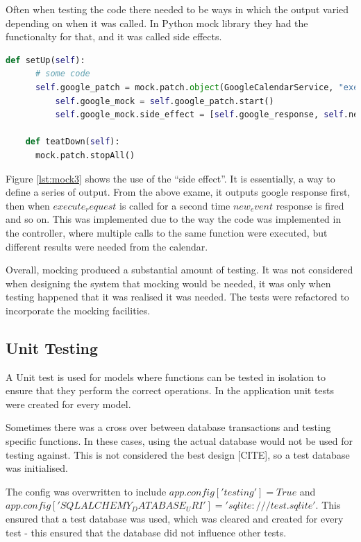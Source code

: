 Often when testing the code there needed to be ways in which the output varied depending on when it was called. In Python mock library they had the functionalty for that, and it was called side effects.

\begin{lstlisting}[language=python, label={lst:mock3}, breaklines, columns=fullflexible, keywordstyle=\color{blue}]
    def setUp(self):
      # some code
      self.google_patch = mock.patch.object(GoogleCalendarService, "execute_request")
          self.google_mock = self.google_patch.start()
          self.google_mock.side_effect = [self.google_response, self.new_event, self.google_response, self.updated_response]

    def teatDown(self):
      mock.patch.stopAll()
\end{lstlisting}

Figure \ref{lst:mock3} shows the use of the ``side effect''. It is essentially, a way to define a series of output. From the above exame, it outputs google response first, then when $execute_request$ is called for a second time $new_event$ response is fired and so on. This was implemented due to the way the code was implemented in the controller, where multiple calls to the same function were executed, but different results were needed from the calendar.

Overall, mocking produced a substantial amount of testing. It was not considered when designing the system that mocking would be needed, it was only when testing happened that it was realised it was needed. The tests were refactored to incorporate the mocking facilities.

\subsection{Unit Testing}
A Unit test is used for models where functions can be tested in isolation to ensure that they perform the correct operations. In the application unit tests were created for every model.

Sometimes there was a cross over between database transactions and testing specific functions. In these cases, using the actual database would not be used for testing against. This is not considered the best design [CITE], so a test database was initialised.

The config was overwritten to include $app.config['testing'] = True$ and $app.config['SQLALCHEMY_DATABASE_URI'] = 'sqlite:///test.sqlite'$. This ensured that a test database was used, which was cleared and created for every test - this ensured that the database did not influence other tests.

